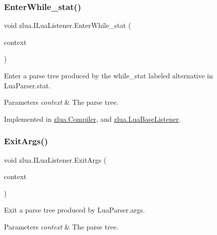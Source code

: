 \subsubsection{\texorpdfstring{Enter\+While\+\_\+stat()}{EnterWhile\_stat()}}
{\footnotesize\ttfamily void zlua.\+I\+Lua\+Listener.\+Enter\+While\+\_\+stat (\begin{DoxyParamCaption}\item[{\mbox{[}\+Not\+Null\mbox{]} \mbox{\hyperlink{classzlua_1_1_lua_parser_1_1_while__stat_context}{Lua\+Parser.\+While\+\_\+stat\+Context}}}]{context }\end{DoxyParamCaption})}



Enter a parse tree produced by the {\ttfamily while\+\_\+stat} labeled alternative in Lua\+Parser.\+stat. 


\begin{DoxyParams}{Parameters}
{\em context} & The parse tree.\\
\hline
\end{DoxyParams}


Implemented in \mbox{\hyperlink{classzlua_1_1_compiler_a353452b5dbe912d06c08a6429be95906}{zlua.\+Compiler}}, and \mbox{\hyperlink{classzlua_1_1_lua_base_listener_a9b8d8a799001a9167716f892e540ba76}{zlua.\+Lua\+Base\+Listener}}.

\mbox{\label{interfacezlua_1_1_i_lua_listener_ad480b971cdba492e0fb0221dc80bb690}} 
\subsubsection{\texorpdfstring{Exit\+Args()}{ExitArgs()}}
{\footnotesize\ttfamily void zlua.\+I\+Lua\+Listener.\+Exit\+Args (\begin{DoxyParamCaption}\item[{\mbox{[}\+Not\+Null\mbox{]} \mbox{\hyperlink{classzlua_1_1_lua_parser_1_1_args_context}{Lua\+Parser.\+Args\+Context}}}]{context }\end{DoxyParamCaption})}



Exit a parse tree produced by Lua\+Parser.\+args. 


\begin{DoxyParams}{Parameters}
{\em context} & The parse tree.\\
\hline
\end{DoxyParams}


